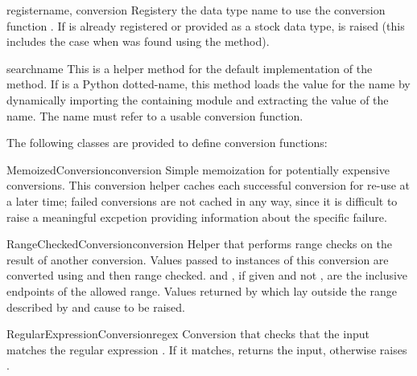 \documentclass{howto}
\begin{document}
\begin{methoddesc}{register}{name, conversion}
  Registery the data type name  to use the conversion
  function .  If  is already registered or
  provided as a stock data type,  is raised
  (this includes the case when  was found using the
   method).
\end{methoddesc}

\begin{methoddesc}{search}{name}
  This is a helper method for the default implementation of the
   method.  If  is a Python dotted-name, this
  method loads the value for the name by dynamically importing the
  containing module and extracting the value of the name.  The name
  must refer to a usable conversion function.
\end{methoddesc}


The following classes are provided to define conversion functions:

\begin{classdesc}{MemoizedConversion}{conversion}
  Simple memoization for potentially expensive conversions.  This
  conversion helper caches each successful conversion for re-use at a
  later time; failed conversions are not cached in any way, since it
  is difficult to raise a meaningful excpetion providing information
  about the specific failure.
\end{classdesc}

\begin{classdesc}{RangeCheckedConversion}{conversion}
  Helper that performs range checks on the result of another
  conversion.  Values passed to instances of this conversion are
  converted using  and then range checked.  
  and , if given and not , are the inclusive
  endpoints of the allowed range.  Values returned by 
  which lay outside the range described by  and 
  cause  to be raised.
\end{classdesc}

\begin{classdesc}{RegularExpressionConversion}{regex}
  Conversion that checks that the input matches the regular expression
  .  If it matches, returns the input, otherwise raises
  .
\end{classdesc}
\end{document}
